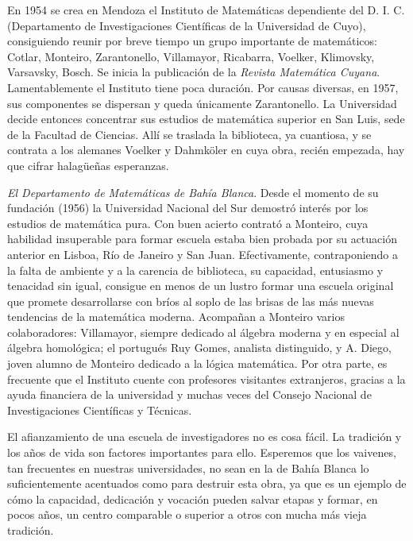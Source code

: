 En 1954 se crea en Mendoza el Instituto de Matemáticas dependiente del D. I. C.
(Departamento de Investigaciones Científicas de la Universidad de Cuyo),
consiguiendo reunir por breve tiempo un grupo importante de matemáticos:
Cotlar, Monteiro, Zarantonello, Villamayor, Ricabarra, Voelker, Klimovsky,
Varsavsky, Bosch. Se inicia la publicación de la \emph{Revista Matemática
Cuyana}. Lamentablemente el Instituto tiene poca duración. Por causas diversas,
en 1957, sus componentes se dispersan y queda únicamente Zarantonello. La
Universidad decide entonces concentrar sus estudios de matemática superior en
San Luis, sede de la Facultad de Ciencias. Allí se traslada la biblioteca, ya
cuantiosa, y se contrata a los alemanes Voelker y Dahmk\"oler en cuya obra,
recién empezada, hay que cifrar halagüeñas esperanzas. 

\emph{El Departamento de Matemáticas de Bahía Blanca}. Desde el momento de su
fundación (1956) la Universidad Nacional del Sur demostró interés por los
estudios de matemática pura. Con buen acierto contrató a Monteiro, cuya
habilidad insuperable para formar escuela estaba bien probada por su actuación
anterior en Lisboa, Río de Janeiro y San Juan. Efectivamente, contraponiendo a
la falta de ambiente y a la carencia de biblioteca, su capacidad, entusiasmo y
tenacidad sin igual, consigue en menos de un lustro formar una escuela original
que promete desarrollarse con bríos al soplo de las brisas de las más nuevas
tendencias de la matemática moderna. Acompañan a Monteiro varios colaboradores:
Villamayor, siempre dedicado al álgebra moderna y en especial al álgebra
homológica; el portugués Ruy Gomes, analista distinguido, y A. Diego, joven
alumno de Monteiro dedicado a la lógica matemática. Por otra parte, es
frecuente que el Instituto cuente con profesores visitantes extranjeros,
gracias a la ayuda financiera de la universidad y muchas veces del Consejo
Nacional de Investigaciones Científicas y Técnicas. 

El afianzamiento de una escuela de investigadores no es cosa fácil. La
tradición y los años de vida son factores importantes para ello. Esperemos que
los vaivenes, tan frecuentes en nuestras universidades, no sean en la de Bahía
Blanca lo suficientemente acentuados como para destruir esta obra, ya que es un
ejemplo de cómo la capacidad, dedicación y vocación pueden salvar etapas y
formar, en pocos años, un centro comparable o superior a otros con mucha más
vieja tradición.

